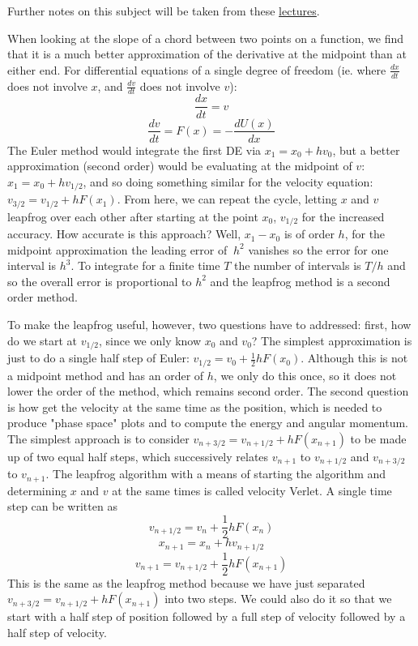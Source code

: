 \documentclass[12pt]{article}
\begin{document}
Further notes on this subject will be taken from these \href{physics.ucsc.edu/~peter/242/leapfrog.pdf}{lectures}.

When looking at the slope of a chord between two points on a function, we find that it is a much better approximation of the derivative at the midpoint than at either end. For differential equations of a single degree of freedom (ie. where $\frac{dx}{dt}$ does not involve $x$, and $\frac{dv}{dt}$ does not involve $v$):
$$\frac{dx}{dt}=v$$
$$\frac{dv}{dt}=F(x)=-\frac{dU(x)}{dx}$$
The Euler method would integrate the first DE via $x_1=x_0+hv_0$, but a better approximation (second order) would be evaluating at the midpoint of $v$: $x_1=x_0+hv_{1/2}$, and so doing something similar for the velocity equation: $v_{3/2}=v_{1/2}+hF(x_1)$. From here, we can repeat the cycle, letting $x$ and $v$ leapfrog over each other after starting at the point $x_0$, $v_{1/2}$ for the increased accuracy. How accurate is this approach? Well, $x_1-x_0$ is of order $h$, for the midpoint approximation the leading error of $~h^2$ vanishes so the error for one interval is $h^3$. To integrate for a finite time $T$ the number of intervals is $T/h$ and so the overall error is proportional to $h^2$ and the leapfrog method is a second order method.

To make the leapfrog useful, however, two questions have to addressed: first, how do we start at $v_{1/2}$, since we only know $x_0$ and $v_0$? The simplest approximation is just to do a single half step of Euler: $v_{1/2}=v_0+\frac{1}{2}hF(x_0)$. Although this is not a midpoint method and has an order of $h$, we only do this once, so it does not lower the order of the method, which remains second order. The second question is how get the velocity at the same time as the position, which is needed to produce "phase space" plots and to compute the energy and angular momentum. The simplest approach is to consider $v_{n+3/2}=v_{n+1/2}+hF(x_{n+1})$ to be made up of two equal half steps, which successively relates $v_{n+1}$ to $v_{n+1/2}$ and $v_{n+3/2}$ to $v_{n+1}$. The leapfrog algorithm with a means of starting the algorithm and determining $x$ and $v$ at the same times is called velocity Verlet. A single time step can be written as
$$v_{n+1/2}=v_n+\frac{1}{2}hF(x_n)$$
$$x_{n+1}=x_n+hv_{n+1/2}$$
$$v_{n+1}=v_{n+1/2}+\frac{1}{2}hF(x_{n+1})$$
This is the same as the leapfrog method because we have just separated $v_{n+3/2}=v_{n+1/2}+hF(x_{n+1})$ into two steps. We could also do it so that we start with a half step of position followed by a full step of velocity followed by a half step of velocity.
\end{document}
